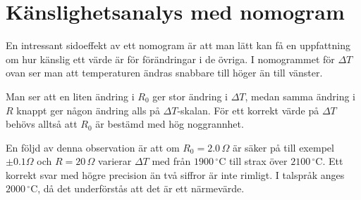 \documentclass[oneside,11pt,a4paper,swedish]{scrbook}
\begin{document}
\section{Känslighetsanalys med nomogram} En intressant sidoeffekt av ett nomogram är att man lätt kan få en uppfattning om hur känslig ett värde är för förändringar i de övriga. I nomogrammet för $\Delta T$ ovan ser man att temperaturen ändras snabbare till höger än till vänster.  

Man ser att en liten ändring i $R_0$ ger stor ändring i $\Delta T$, medan samma ändring i $R$ knappt ger någon ändring alls på  $\Delta T$-skalan. För ett korrekt värde på $\Delta T$ behövs alltså att $R_0$ är bestämd med hög noggrannhet. 

En följd av denna observation är att om $R_0=2.0\,\Omega$ är säker på till exempel $\pm 0.1 \Omega$ och $R=20 \,\Omega$ varierar $\Delta T$ med från $1900\,^\circ\textrm{C}$ till strax över $2100\,^\circ\textrm{C}$. Ett korrekt svar med högre precision än två siffror är inte rimligt. I talspråk  anges $2000\,^\circ\textrm{C}$, då det underförstås att det är ett närmevärde. 


\appendix
\end{document}
